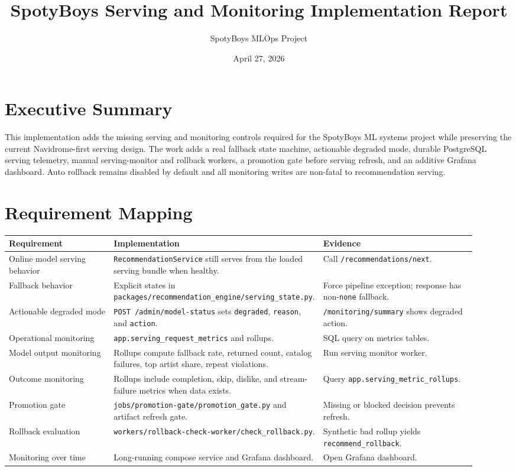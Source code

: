 \documentclass[11pt]{article}
\title{SpotyBoys Serving and Monitoring Implementation Report}
\author{SpotyBoys MLOps Project}
\date{April 27, 2026}
\begin{document}
\maketitle

\section*{Executive Summary}
This implementation adds the missing serving and monitoring controls required for the SpotyBoys ML systems project while preserving the current Navidrome-first serving design. The work adds a real fallback state machine, actionable degraded mode, durable PostgreSQL serving telemetry, manual serving-monitor and rollback workers, a promotion gate before serving refresh, and an additive Grafana dashboard. Auto rollback remains disabled by default and all monitoring writes are non-fatal to recommendation serving.

\section*{Requirement Mapping}
\begin{longtable}{p{0.24\linewidth}p{0.34\linewidth}p{0.34\linewidth}}
\toprule
\textbf{Requirement} & \textbf{Implementation} & \textbf{Evidence} \\
\midrule
Online model serving behavior & \texttt{RecommendationService} still serves from the loaded serving bundle when healthy. & Call \texttt{/recommendations/next}. \\
Fallback behavior & Explicit states in \texttt{packages/recommendation\_engine/serving\_state.py}. & Force pipeline exception; response has non-\texttt{none} fallback. \\
Actionable degraded mode & \texttt{POST /admin/model-status} sets \texttt{degraded}, \texttt{reason}, and \texttt{action}. & \texttt{/monitoring/summary} shows degraded action. \\
Operational monitoring & \texttt{app.serving\_request\_metrics} and rollups. & SQL query on metrics tables. \\
Model output monitoring & Rollups compute fallback rate, returned count, catalog failures, top artist share, repeat violations. & Run serving monitor worker. \\
Outcome monitoring & Rollups include completion, skip, dislike, and stream-failure metrics when data exists. & Query \texttt{app.serving\_metric\_rollups}. \\
Promotion gate & \texttt{jobs/promotion-gate/promotion\_gate.py} and artifact refresh gate. & Missing or blocked decision prevents refresh. \\
Rollback evaluation & \texttt{workers/rollback-check-worker/check\_rollback.py}. & Synthetic bad rollup yields \texttt{recommend\_rollback}. \\
Monitoring over time & Long-running compose service and Grafana dashboard. & Open Grafana dashboard. \\
\bottomrule
\end{longtable}
\end{document}
